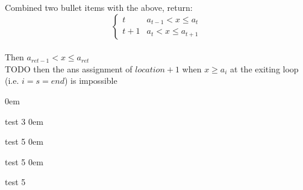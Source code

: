 \documentclass{article}
\newcommand{\mywrongitem}{\itemsep0em \addtocounter{todolisti}{1}\item}
\newcommand{\CurTodolistToplevelIndex}{\number\numexpr\value{todolisti}\relax}
\begin{document}
\begin{todolist}[itemsep=0pt,parsep=0pt,start=3]
    Combined two bullet items with the above, return:\\
    \[
        \begin{cases}
            t & a_{t-1}<x\le a_{t} \\
            t+1 & a_{t}<x\le a_{t+1}
        \end{cases}
    \]\\
    Then \(a_{ret-1}<x\le a_{ret}\)\\
    TODO then the ans assignment of $location+1$ when \(x\ge a_i\) at the exiting loop (i.e. \(i=s=end\)) is impossible
\end{todolist}

\newpage
\begin{todolist}[resume*,start=\CurTodolistToplevelIndex]
    \mywrongitem test 3
    \mywrongitem test 5
    \mywrongitem test 5
    \mywrongitem test 5
\end{todolist}
\end{document}
